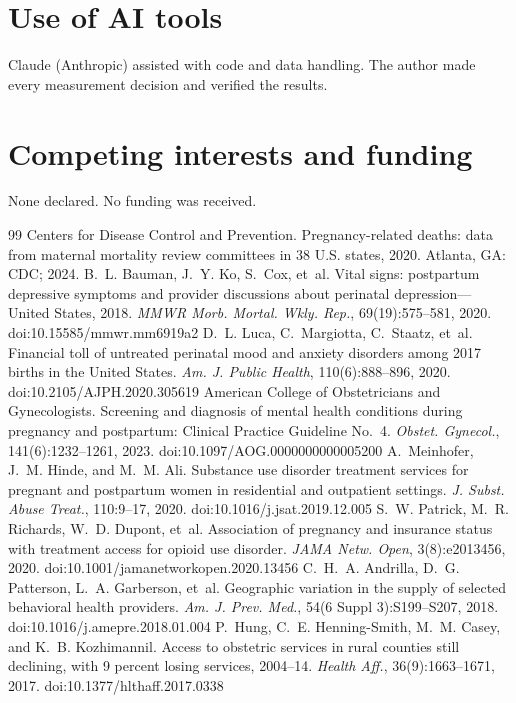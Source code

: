 \documentclass[10pt,twocolumn,letterpaper]{article}
\begin{document}
\section*{Use of AI tools}
Claude (Anthropic) assisted with code and data handling. The author made every measurement decision and verified the results.

\section*{Competing interests and funding}
None declared. No funding was received.

\begin{thebibliography}{99}
 Centers for Disease Control and Prevention. Pregnancy-related deaths: data from maternal mortality review committees in 38 U.S. states, 2020. Atlanta, GA: CDC; 2024.
 B.~L. Bauman, J.~Y. Ko, S.~Cox, et~al. Vital signs: postpartum depressive symptoms and provider discussions about perinatal depression---United States, 2018. \emph{MMWR Morb. Mortal. Wkly. Rep.}, 69(19):575--581, 2020. doi:10.15585/mmwr.mm6919a2
 D.~L. Luca, C.~Margiotta, C.~Staatz, et~al. Financial toll of untreated perinatal mood and anxiety disorders among 2017 births in the United States. \emph{Am. J. Public Health}, 110(6):888--896, 2020. doi:10.2105/AJPH.2020.305619
 American College of Obstetricians and Gynecologists. Screening and diagnosis of mental health conditions during pregnancy and postpartum: Clinical Practice Guideline No.~4. \emph{Obstet. Gynecol.}, 141(6):1232--1261, 2023. doi:10.1097/AOG.0000000000005200
 A.~Meinhofer, J.~M. Hinde, and M.~M. Ali. Substance use disorder treatment services for pregnant and postpartum women in residential and outpatient settings. \emph{J. Subst. Abuse Treat.}, 110:9--17, 2020. doi:10.1016/j.jsat.2019.12.005
 S.~W. Patrick, M.~R. Richards, W.~D. Dupont, et~al. Association of pregnancy and insurance status with treatment access for opioid use disorder. \emph{JAMA Netw. Open}, 3(8):e2013456, 2020. doi:10.1001/jamanetworkopen.2020.13456
 C.~H.~A. Andrilla, D.~G. Patterson, L.~A. Garberson, et~al. Geographic variation in the supply of selected behavioral health providers. \emph{Am. J. Prev. Med.}, 54(6 Suppl 3):S199--S207, 2018. doi:10.1016/j.amepre.2018.01.004
 P.~Hung, C.~E. Henning-Smith, M.~M. Casey, and K.~B. Kozhimannil. Access to obstetric services in rural counties still declining, with 9 percent losing services, 2004--14. \emph{Health Aff.}, 36(9):1663--1671, 2017. doi:10.1377/hlthaff.2017.0338

\end{thebibliography}
\end{document}
